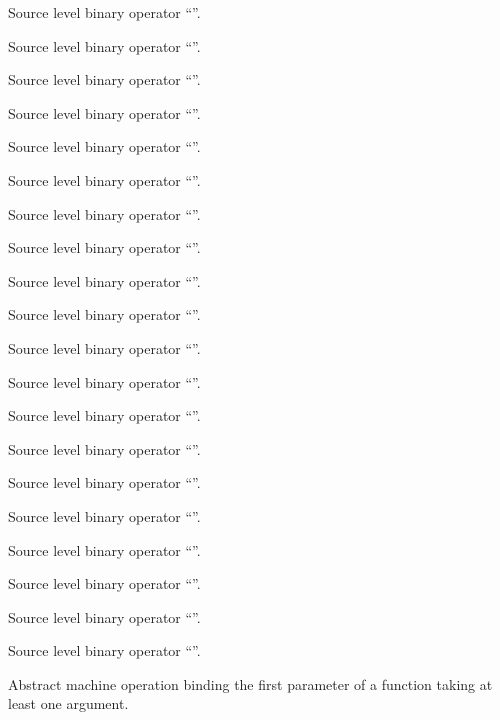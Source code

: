 Source level binary operator ``\code{>=}''.

Source level binary operator ``\code{<=>}''.

Source level binary operator ``\code{\&\&}''.


Source level binary operator ``\code{||}''.

Source level binary operator ``\code{=}''.

Source level binary operator ``\code{+=}''.

Source level binary operator ``\code{-=}''.

Source level binary operator ``\code{*=}''.

Source level binary operator ``\code{/=}''.

Source level binary operator ``\code{\%=}''.

Source level binary operator ``\code{\&=}''.

Source level binary operator ``\code{|=}''.

Source level binary operator ``\code{\^=}''.

Source level binary operator ``\code{<<=}''.

Source level binary operator ``\code{>>=}''.

Source level binary operator ``\code{,}''.

Source level binary operator ``''.

Source level binary operator ``\code{->}''.

Source level binary operator ``''.

Source level binary operator ``\code{->*}''.

Abstract machine operation binding the first parameter of a function taking at least one argument.

